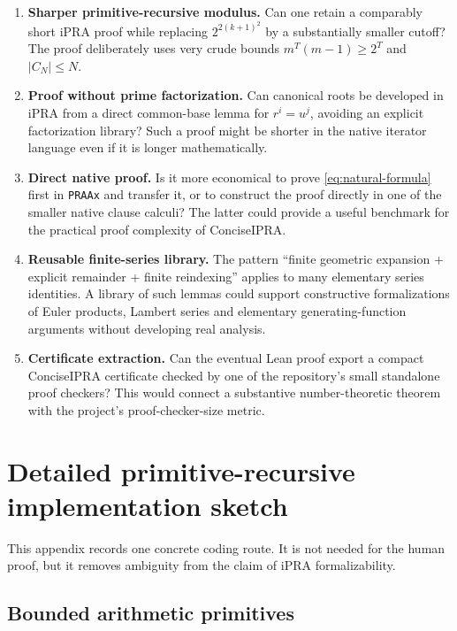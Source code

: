 \documentclass[11pt]{article}
\theoremstyle{definition}
\begin{document}
\begin{enumerate}[label=\textbf{Q\arabic*.},leftmargin=*]
\item \textbf{Sharper primitive-recursive modulus.}
Can one retain a comparably short iPRA proof while replacing
$2^{2(k+1)^2}$ by a substantially smaller cutoff?  The proof deliberately
uses very crude bounds $m^T(m-1)\ge2^T$ and $|C_N|\le N$.

\item \textbf{Proof without prime factorization.}
Can canonical roots be developed in iPRA from a direct common-base lemma for
$r^i=u^j$, avoiding an explicit factorization library?  Such a proof might be
shorter in the native iterator language even if it is longer mathematically.

\item \textbf{Direct native proof.}
Is it more economical to prove \eqref{eq:natural-formula} first in
\texttt{PRAAx} and transfer it, or to construct the proof directly in one of
the smaller native clause calculi?  The latter could provide a useful
benchmark for the practical proof complexity of ConciseIPRA.

\item \textbf{Reusable finite-series library.}
The pattern ``finite geometric expansion + explicit remainder + finite
reindexing'' applies to many elementary series identities.  A library of such
lemmas could support constructive formalizations of Euler products, Lambert
series and elementary generating-function arguments without developing real
analysis.

\item \textbf{Certificate extraction.}
Can the eventual Lean proof export a compact ConciseIPRA certificate checked by
one of the repository's small standalone proof checkers?  This would connect a
substantive number-theoretic theorem with the project's proof-checker-size
metric.
\end{enumerate}

\appendix

\section{Detailed primitive-recursive implementation sketch}

This appendix records one concrete coding route.  It is not needed for the
human proof, but it removes ambiguity from the claim of iPRA formalizability.

\subsection{Bounded arithmetic primitives}
\end{document}
